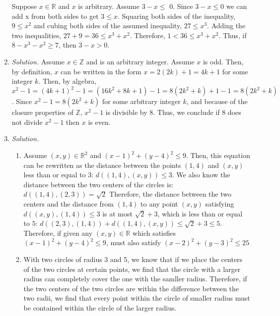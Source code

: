 \documentclass{article}
\newcommand{\rr}{\mathbb R}
\newcommand{\zz}{\mathbb Z}
\begin{document}
\begin{enumerate}
            Suppose $x \in \rr$ and $x$ is arbitrary. Assume $3-x \leq$ 0.
            Since $3-x \leq 0$ we can add x from both sides to get $3 \leq x$. Squaring both 
            sides of the inequality, $9 \leq x^2$ and cubing both sides of the assumed inequality, 
            $27 \leq x^3$. Adding the two inequalities, $27 + 9 = 36 \leq x^3 + x^2$. 
            Therefore, $1 < 36 \leq x^3 + x^2$. Thus, if $8-x^3-x^2 \geq 7$, then $3-x > 0$. 
        \item \emph{Solution.} 
            Assume $x \in \zz$ and is an arbitrary integer. Assume $x$ is odd. Then, by definition, 
            $x$ can be written in the form $x = 2(2k) + 1 = 4k + 1$ for some integer $k$. Then, by algebra, 
            $x^2 - 1 = (4k+1)^2 - 1 = (16k^2+8k+1)-1 = 8(2k^2+k)+1-1 = 8(2k^2+k)$. Since 
            $x^2-1 = 8(2k^2+k)$ for some arbitrary integer $k$, and because of the closure properties of $\zz$,
            $x^2-1$ is divisible by 8. Thus, we conclude if 8 does not divide $x^2-1$ then $x$ is even. 
        \item \emph{Solution.}
            \begin{enumerate}
                \item Assume $(x, y) \in \rr^2$ and $(x-1)^2 + (y-4)^2 \leq 9$. Then, this equation can be rewritten as 
                      the distance between the points $(1, 4)$ and $(x, y)$ less than or equal to 3: $d((1, 4), (x, y)) \leq 3$.
                      We also know the distance between the two centers of the circles is: $d((1, 4), (2, 3)) = \sqrt{2}$
                      Therefore, the distance between the two centers and the distance from $(1, 4)$ to any point $(x, y)$
                      satisfying $d((x, y), (1, 4)) \leq 3$ is at most $\sqrt{2} + 3$, which is less than or equal to $5$: $d((2, 3), (1, 4)) + d((1, 4), (x, y)) \leq \sqrt{2} + 3 \leq 5$.
                      Therefore, if given any $(x, y) \in \rr$ which satisfies $(x-1)^2 + (y-4)^2 \leq 9$, must also satisfy $(x-2)^2 + (y-3)^2 \leq 25$
                \item With two circles of radius 3 and 5, we know that if we place the centers of the two circles at certain points, 
                    we find that the circle with a larger radius can completely cover the one with the samller radius. Therefore, if 
                    the two centers of the two circles are within the difference between the two radii, we find that every point within
                    the circle of smaller radius must be contained within the circle of the larger radius. 
            \end{enumerate}
            

\end{enumerate}
\end{document}
